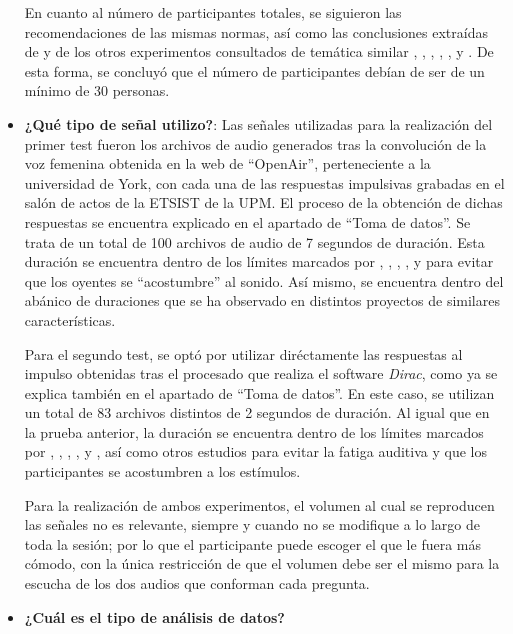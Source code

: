 \documentclass[11pt,a4paper,twoside]{book}
\begin{document}
\begin{itemize}
                En cuanto al número de participantes totales, se siguieron las recomendaciones de las mismas normas, así como las conclusiones extraídas de \cite{Tejada2020} y de los otros experimentos consultados de temática similar \cite{2005IWitew}, \cite{2016SKlockgether}, \cite{2019LKritly}, \cite{2019GPulvirenti}, \cite{2019MNowak}, \cite{2019DJSchlit} y \cite{2011VEmiya}. De esta forma, se concluyó que el número de participantes debían de ser de un mínimo de 30 personas.
                \item \textbf{¿Qué tipo de señal utilizo?}: Las señales utilizadas para la realización del primer test fueron los archivos de audio generados tras la convolución de la voz femenina obtenida en la web de ``OpenAir'', perteneciente a la universidad de York, con cada una de las respuestas impulsivas grabadas en el salón de actos de la ETSIST de la UPM. El proceso de la obtención de dichas respuestas se encuentra explicado en el apartado de ``Toma de datos''. Se trata de un total de 100 archivos de audio de 7 segundos de duración. Esta duración se encuentra dentro de los límites marcados por \cite{UIT1116}, \cite{UIT1534}, \cite{UIT1284}, \cite{EBU3286}, \cite{UIT1285} y \cite{UIT1286} para evitar que los oyentes se ``acostumbre'' al  sonido. Así mismo, se encuentra dentro del abánico de duraciones que se ha observado en distintos proyectos de similares características. \newline
                
                Para el segundo test, se optó por utilizar diréctamente las respuestas al impulso obtenidas tras el procesado que realiza el software \textit{Dirac}, como ya se explica también en el apartado de ``Toma de datos''. En este caso, se utilizan un total de 83 archivos distintos de 2 segundos de duración. Al igual que en la prueba anterior, la duración se encuentra dentro de los límites marcados por \cite{UIT1116}, \cite{UIT1534}, \cite{UIT1284}, \cite{EBU3286}, \cite{UIT1285} y \cite{UIT1286}, así como otros estudios para evitar la fatiga auditiva y que los participantes se acostumbren a los estímulos.
                
                Para la realización de ambos experimentos, el volumen al cual se reproducen las señales no es relevante, siempre y cuando no se modifique a lo largo de toda la sesión; por lo que el participante puede escoger el que le fuera más cómodo, con la única restricción de que el volumen debe ser el mismo para la escucha de los dos audios que conforman cada pregunta.
                \item \textbf{¿Cuál es el tipo de análisis de datos?}
            \end{itemize}
\end{document}
